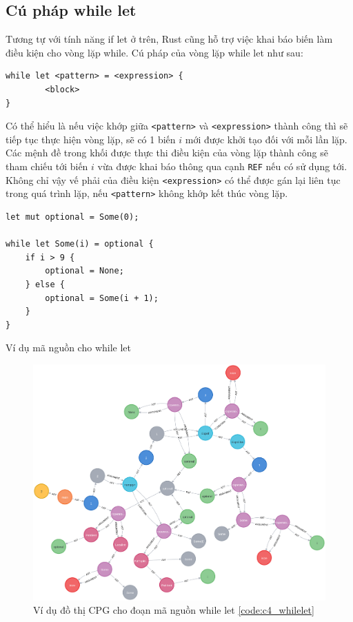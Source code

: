 \subsection{Cú pháp while let}

Tương tự với tính năng if let ở trên, Rust cũng hỗ trợ việc khai báo biến làm điều kiện cho vòng lặp while. Cú pháp của vòng lặp while let như sau:

\begin{verbatim}
while let <pattern> = <expression> {
        <block>
}
\end{verbatim}

Có thể hiểu là nếu việc khớp giữa \texttt{<pattern>} và \texttt{<expression>} thành công thì sẽ tiếp tục thực hiện vòng lặp, sẽ có 1 biến $i$ mới được khởi tạo đối với mỗi lần lặp.
Các mệnh đề trong khối được thực thi điều kiện của vòng lặp thành công sẽ tham chiếu tới biến $i$ vừa được khai báo thông qua cạnh \texttt{REF} nếu có sử dụng tới.
Không chỉ vậy vế phải của điều kiện \texttt{<expression>} có thể được gán lại liên tục trong quá trình lặp, nếu \texttt{<pattern>} không khớp kết thúc vòng lặp.

\begin{listing}[H]
\begin{verbatim}
let mut optional = Some(0);

while let Some(i) = optional {
    if i > 9 {
        optional = None;
    } else {
        optional = Some(i + 1);
    }
}
\end{verbatim}
\caption{Ví dụ mã nguồn cho while let}
\label{code:c4_whilelet}
\end{listing}

\begin{figure}[H]
    \includegraphics[width=1\columnwidth]{figures/c4/c4_whilelet.png}
    \centering
    \caption{Ví dụ đồ thị CPG cho đoạn mã nguồn while let \ref{code:c4_whilelet}}
    \label{img:c4_cpg_whilelet}
\end{figure}

